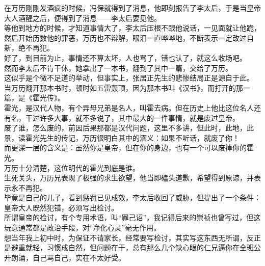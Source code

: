 \begin{multicols}{\theparacolNo}
在万历刚刚发酒疯的时候，冯保就得到了消息，他即刻报告了李太后，于是当皇帝大人酒醒之后，便得到了消息——李太后要见他。\\

等他到地方的时候，才知道事情大了，李太后压根不跟他说话，一见面就让他跪，然后开始历数他的罪恶，万历也不辩解，眼泪一直哗哗地，不断表示一定改过自新，绝不再犯。\\

好了，到目前为止，事情还不算太坏，人也骂了，错也认了，就这么收场吧。\\

然而李太后不肯干休，她拿出了一本书，翻到了其中一篇，交给了万历。\\

这似乎是个微不足道的举动，但事实上，张居正先生的悲惨结局正是源自于此。\\

当万历翻开那本书时，顿时如五雷轰顶，因为那本书叫《汉书》，而打开的那一篇，是《霍光传》。\\

霍光，是汉代人物，有个异母兄弟是名人，叫霍去病。但在历史上他比这位名人还有名，干过许多大事，就不多说了，其中最大的一件事情，就是废过皇帝。\\

废了谁，怎么废的，前因后果那都是汉代问题，这里不多讲，但此时，此地，此景，读霍光先生的传记，万历很明白其中的涵义：如果不听话，就废了你！\\

而更深一层的含义是：虽然你是皇帝，但在你的身边，也有一个可以废掉你的霍光。\\

万历十分清楚，这位明代的霍光到底是谁。\\

生死关头，万历兄表现了极强的求生欲望，他当即磕头道歉，希望得到原谅，并表示永不再犯。\\

毕竟是自己的儿子，看到惩罚已见成效，李太后收回了威胁，但提出了一个条件：皇帝大人既然犯错，必须写出检讨。\\

所谓皇帝的检讨，有个专用术语，叫“罪己诏”，我记得后来的崇祯也曾写过，但这玩意通常都是政治手段，对“净化心灵”毫无作用。\\

想当年我上初中时，为保证不请家长，经常要写检讨，其实写这东西无所谓，反正是避重就轻，习惯成自然，但问题在于，总有那么几个缺心眼的仁兄逼你在全班公开朗诵，自己骂自己，实在不太好受。\\


\end{multicols}
